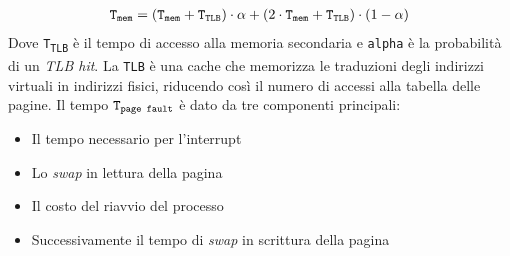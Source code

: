         \begin{align*}
            \texttt{T\textsubscript{mem}} = (\texttt{T\textsubscript{mem}} + \texttt{T\textsubscript{TLB}}) \cdot \alpha + (2 \cdot \texttt{T\textsubscript{mem}} + \texttt{T\textsubscript{TLB}}) \cdot (1-\alpha)
        \end{align*}
        Dove \texttt{T\textsubscript{TLB}} è il tempo di accesso alla memoria secondaria e \texttt{alpha} è la probabilità di un \textit{TLB hit}. La \texttt{TLB} è una cache che memorizza le traduzioni degli indirizzi virtuali in indirizzi fisici, riducendo così il numero di accessi alla tabella delle pagine.\newline
        Il tempo $\texttt{T\textsubscript{page fault}}$ è dato da tre componenti principali:
        \begin{itemize}
            \item Il tempo necessario per l'interrupt 
            \item Lo \textit{swap} in lettura della pagina
            \item Il costo del riavvio del processo
            \item Successivamente il tempo di \textit{swap} in scrittura della pagina
        \end{itemize}
